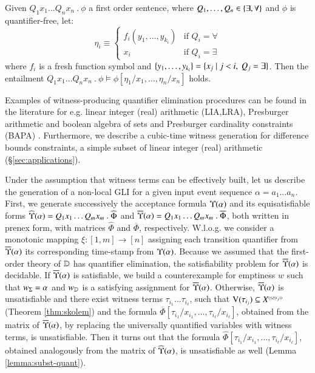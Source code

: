 \documentclass{llncs}
\begin{document}
\begin{theorem}\label{thm:skolem}
  Given $Q_1 x_1 \ldots Q_n x_n ~.~ \phi$ a first order sentence, 
  where $Q_1, \ldots, Q_n \in \{ \exists,\forall \}$ and $\phi$ is
  quantifier-free, let: 
  \[\eta_i \equiv \left\{\begin{array}{ll}
  f_i(y_1,\ldots,y_{k_i}) & \text{if } Q_i = \forall \\
  x_i & \text{if } Q_i = \exists
  \end{array}\right.\]
  where $f_i$ is a fresh function symbol and $\{ y_1, \ldots,
    y_{k_i} \} = \{ x_j \mid j < i,~ Q_j = \exists \}$. Then the entailment \(Q_1
  x_1 \ldots Q_n x_n ~.~ \phi \models
  \phi[\eta_1/x_1,\ldots,\eta_n/x_n]\) holds. 
\end{theorem}

Examples of witness-producing quantifier elimination procedures can be
found in the literature for e.g. linear integer (real) arithmetic
(LIA,LRA), Presburger arithmetic and boolean algebra of sets and
Presburger cardinality constraints (BAPA)
\cite{KuncakMayerPiskacSuter12}. Furthermore, we describe a cubic-time
witness generation for difference bounds constraints, a simple subset
of linear integer (real) arithmetic (\S\ref{sec:applications}).

Under the assumption that witness terms can be effectively built, let
us describe the generation of a non-local GLI for a given input event
sequence $\alpha = a_1 \ldots a_n$. First, we generate successively
the acceptance formula $\Upsilon({\alpha})$ and its equisatisfiable
forms $\widehat{\Upsilon}({\alpha}) = Q_1x_1 \ldots Q_mx_m ~.~ \widehat{\Phi}$
and $\overline{\Upsilon}({\alpha}) = Q_1x_1 \ldots Q_mx_m ~.~ \overline{\Phi}$,
both written in prenex form, with matrices $\widehat{\Phi}$ and
$\overline{\Phi}$, respectively. W.l.o.g. we consider a monotonic
mapping $\xi : [1,m] \rightarrow [n]$ assigning each transition
quantifier from $\overline{\Upsilon}({\alpha})$ its corresponding time-stamp from
$\Upsilon({\alpha})$. Because we assumed that the first-order theory of
$\mathbb{D}$ has quantifier elimination, the satisfiability problem for
$\overline{\Upsilon}({\alpha})$ is decidable. If $\overline{\Upsilon}({\alpha})$ is
satisfiable, we build a counterexample for emptiness $w$ such that
${w}_\Sigma=\alpha$ and ${w}_{\mathbb{D}}$ is a satisfying assignment for
$\overline{\Upsilon}({\alpha})$. Otherwise, $\overline{\Upsilon}({\alpha})$ is unsatisfiable
and there exist witness terms $\tau_{i_1} \ldots \tau_{i_\ell}$, such
that $\mathrm{V}({\tau_{i_j}}) \subseteq {X}^{\scriptscriptstyle{({\leq\xi(i_j)})}}$ (Theorem
\ref{thm:skolem}) and the formula $\overline{\Phi}[\tau_{i_1}/x_{i_1},
  \ldots, \tau_{i_\ell}/x_{i_\ell}]$, obtained from the matrix of
$\overline{\Upsilon}({\alpha})$, by replacing the universally quantified
variables with witness terms, is unsatisfiable. Then it turns out that
the formula $\widehat{\Phi}[\tau_{i_1}/x_{i_1}, \ldots,
  \tau_{i_\ell}/x_{i_\ell}]$, obtained analogously from the matrix of
$\widehat{\Upsilon}({\alpha})$, is unsatisfiable as well (Lemma
\ref{lemma:subst-quant}).
\end{document}
